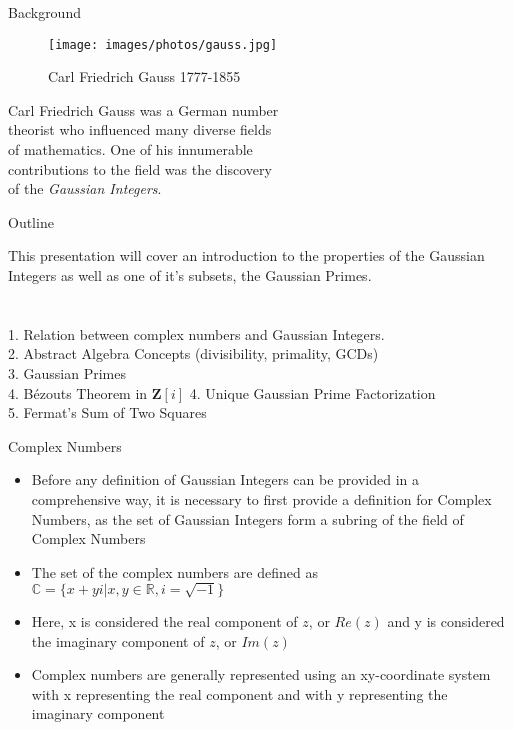 
\begin{frame}{Background}

\begin{wrapfigure}{L}{0.3\textwidth}
\centering
\texttt{[image: images/photos/gauss.jpg]}
\caption{Carl Friedrich Gauss 1777-1855}
\end{wrapfigure} 
Carl Friedrich Gauss was a German  number \\ theorist  who influenced many diverse fields \\ of mathematics. One of his innumerable \\ contributions to the field was the discovery \\ of the \textit{Gaussian Integers}. 
\end{frame}

\begin{frame}{Outline}

This presentation will cover an introduction to the properties of the Gaussian Integers as well as one of it's subsets, the Gaussian Primes. \\
\\ \quad \\
1. Relation between complex numbers and Gaussian Integers. \\
2. Abstract Algebra Concepts (divisibility, primality, GCDs)\\
3. Gaussian Primes \\
4. Bézouts Theorem in $\mathbf{Z}[i]$
4. Unique Gaussian Prime Factorization \\
5. Fermat's Sum of Two Squares 
\end{frame}



\begin{frame}{Complex Numbers}
\begin{itemize}
 \item<1-> Before any definition of Gaussian Integers can be provided in a comprehensive way, it is necessary to first provide a definition for Complex Numbers, as the set of Gaussian Integers form a subring of the field of Complex Numbers
 \item<2-> The set of the complex numbers are defined as $\mathbb{C} = \{x + yi| x, y \in \mathbb{R}, i = \sqrt{-1}\}$
 \item<3-> Here, x is considered the real component of $z$, or $Re(z)$ and y is considered the imaginary component of $z$, or $Im(z)$
 \item<4-> Complex numbers are generally represented using an xy-coordinate system with x representing the real component and with y representing the imaginary component

\end{itemize}  
\end{frame}


